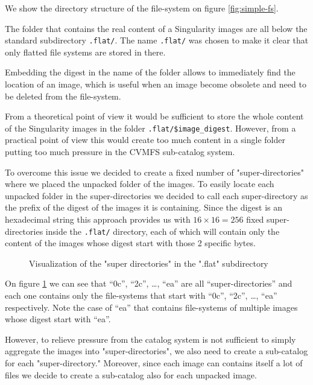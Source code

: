 We show the directory structure of the file-system on figure
\ref{fig:simple-fs}.

The folder that contains the real content of a Singularity images are all below
the standard subdirectory \texttt{.flat/}.  The name \texttt{.flat/} was chosen
to make it clear that only flatted file systems are stored in there.

Embedding the digest in the name of the folder allows to immediately find the
location of an image, which is useful when an image become obsolete and need to
be deleted from the file-system.

From a theoretical point of view it would be sufficient to store the whole
content of the Singularity images in the folder \texttt{.flat/\$image\_digest}.
However, from a practical point of view this would create too much content in a
single folder putting too much pressure in the CVMFS sub-catalog system.

To overcome this issue we decided to create a fixed number of
"super-directories" where we placed the unpacked folder of the images.  To
easily locate each unpacked folder in the super-directories we decided to call
each super-directory as the prefix of the digest of the images it is
containing. Since the digest is an hexadecimal string this approach provides us
with $16 \times 16 = 256$ fixed super-directories inside the \texttt{.flat/}
directory, each of which will contain only the content of the images whose
digest start with those 2 specific bytes.

\begin{figure}
\caption{Visualization of the "super directories" in the ".flat" subdirectory}
\label{fig:super-directories}
\end{figure}

On figure \ref{fig:super-directories} we can see that “0c”, “2c”, …, “ea” are
all “super-directories” and each one contains only the file-systems that start
with “0c”, “2c”, …, “ea” respectively.  Note the case of “ea” that contains
file-systems of multiple images whose digest start with “ea”.

However, to relieve pressure from the catalog system is not sufficient to
simply aggregate the images into "super-directories", we also need to create a
sub-catalog for each "super-directory." Moreover, since each image can contains
itself a lot of files we decide to create a sub-catalog also for each unpacked
image.

